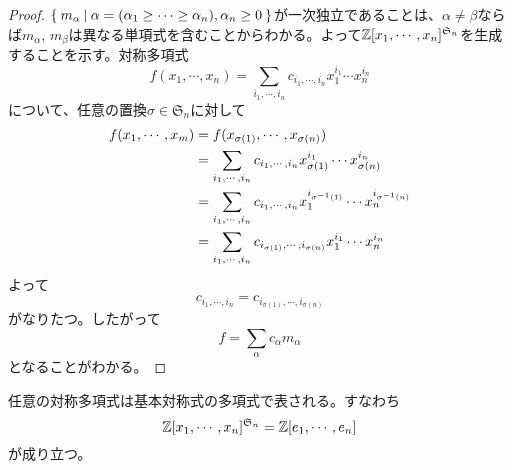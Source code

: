\documentclass{ltjsreport}
\begin{document}
\begin{proof}
    $\left\{\:m_\alpha\:\middle|\:\alpha=(\alpha_1\geq\cdots\geq\alpha_n), \alpha_n\geq 0\:\right\}$が一次独立であることは、$\alpha\neq\beta$ならば$m_\alpha$, $m_\beta$は異なる単項式を含むことからわかる。よって$\mathbb{Z}[x_1,\cdots,x_n]^{\mathfrak{S}_n}$を生成することを示す。対称多項式
    \[
    f(x_1,\cdots,x_n)=\sum_{i_1,\cdots,i_n}c_{i_1,\cdots,i_n}x_1^{i_1}\cdots x_n^{i_n}
    \]
    について、任意の置換$\sigma\in\mathfrak{S}_n$に対して
    \begin{align*}
        f(x_1,\cdots,x_m)&=f(x_{\sigma(1)},\cdots,x_{\sigma(n)})\\
        &=\sum_{i_1,\cdots,i_n}c_{i_1,\cdots,i_n}x_{\sigma(1)}^{i_1}\cdots x_{\sigma(n)}^{i_n}\\
        &=\sum_{i_1,\cdots,i_n}c_{i_1,\cdots,i_n}x_1^{i_{\sigma^{-1}(1)}}\cdots x_n^{i_{\sigma^{-1}(n)}}\\
        &=\sum_{i_1,\cdots,i_n}c_{i_{\sigma(1)},\cdots,i_{\sigma(n)}}x_1^{i_1}\cdots x_n^{i_n}
    \end{align*}
    よって
    \[
        c_{i_1,\cdots,i_n}=c_{i_{\sigma(1)},\cdots,i_{\sigma(n)}}
    \]
    がなりたつ。したがって
    \[
    f=\sum_{\alpha}c_\alpha m_\alpha   
    \]
    となることがわかる。
\end{proof}

\begin{theo}[対称式の基本定理]\label{FT_of_sym}
    任意の対称多項式は基本対称式の多項式で表される。すなわち
    \[
    \mathbb{Z}[x_1,\cdots,x_n]^{\mathfrak{S}_n}=\mathbb{Z}[e_1,\cdots, e_n]
    \]
    が成り立つ。
\end{theo}
\end{document}
